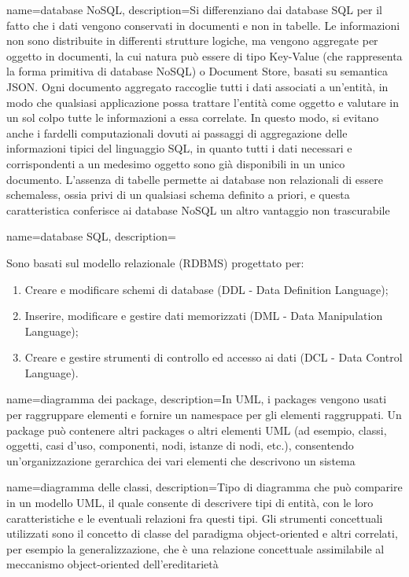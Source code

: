\hypertarget{D}{}

{
	name=database NoSQL,
	description={Si differenziano dai database SQL per il fatto che i dati vengono conservati in documenti e non in tabelle. Le informazioni non sono distribuite in differenti strutture logiche, ma vengono aggregate per oggetto in documenti, la cui natura può essere di tipo Key-Value (che rappresenta la forma primitiva di database NoSQL) o Document Store, basati su semantica JSON. Ogni documento aggregato raccoglie tutti i dati associati a un’entità, in modo che qualsiasi applicazione possa trattare l’entità come oggetto e valutare in un sol colpo tutte le informazioni a essa correlate. In questo modo, si evitano anche i fardelli computazionali dovuti ai passaggi di aggregazione delle informazioni tipici del linguaggio SQL, in quanto tutti i dati necessari e corrispondenti a un medesimo oggetto sono già disponibili in un unico documento. L’assenza di tabelle permette ai database non relazionali di essere schemaless, ossia privi di un qualsiasi schema definito a priori, e questa caratteristica conferisce ai database NoSQL un altro vantaggio non trascurabile}
}

{
	name=database SQL,
	description={Sono basati sul modello relazionale (RDBMS) progettato per:
		\begin{enumerate}  
			\item Creare e modificare schemi di database (DDL - Data Definition Language);
			\item Inserire, modificare e gestire dati memorizzati (DML - Data Manipulation Language);
			\item Creare e gestire strumenti di controllo ed accesso ai dati (DCL - Data Control Language).
		\end{enumerate}
	}
}

{
	name=diagramma dei package,
	description={In UML, i packages vengono usati per raggruppare elementi e fornire un namespace per gli elementi raggruppati. Un package può contenere altri packages o altri elementi UML (ad esempio, classi, oggetti, casi d'uso, componenti, nodi, istanze di nodi, etc.), consentendo un'organizzazione gerarchica dei vari elementi che descrivono un sistema}
}

{
	name=diagramma delle classi,
	description={Tipo di diagramma che può comparire in un modello UML, il quale consente di descrivere tipi di entità, con le loro caratteristiche e le eventuali relazioni fra questi tipi. Gli strumenti concettuali utilizzati sono il concetto di classe del paradigma object-oriented e altri correlati, per esempio la generalizzazione, che è una relazione concettuale assimilabile al meccanismo object-oriented dell'ereditarietà}
}

